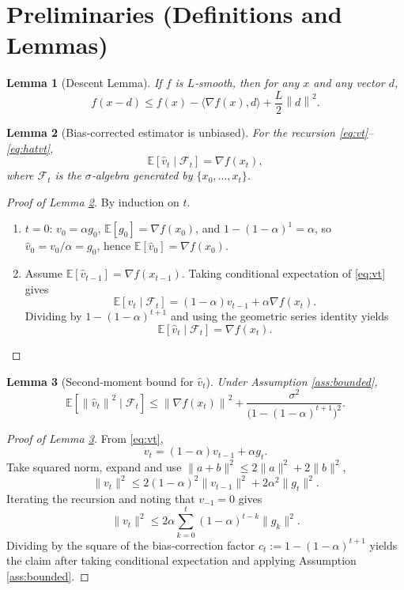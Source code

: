 \documentclass{article}
\newtheorem{lemma}{Lemma}
\newcommand{\E}{\mathbb{E}}
\newcommand{\norm}[1]{\left\lVert#1\right\rVert}
\begin{document}
\newpage
\section*{Preliminaries (Definitions and Lemmas)}
\begin{lemma}[Descent Lemma]\label{lem:descent}
If $f$ is $L$‑smooth, then for any $x$ and any vector $d$,
\[
f(x-d)\le f(x)-\langle\nabla f(x),d\rangle+\frac{L}{2}\norm{d}^2 .
\]
\end{lemma}
\begin{lemma}[Bias‑corrected estimator is unbiased]\label{lem:unbiased}
For the recursion \eqref{eq:vt}–\eqref{eq:hatvt},
\[
\E[\hat v_t\mid\mathcal{F}_t]=\nabla f(x_t),
\]
where $\mathcal{F}_t$ is the $\sigma$‑algebra generated by $\{x_0,\dots,x_t\}$.
\end{lemma}
\begin{proof}[Proof of Lemma \ref{lem:unbiased}]
By induction on $t$.
\begin{enumerate}
    \item[(Base)] $t=0$: $v_0=\alpha g_0$, $\E[g_0]=\nabla f(x_0)$, and $1-(1-\alpha)^{1}=\alpha$, so $\hat v_0=v_0/\alpha=g_0$, hence $\E[\hat v_0]=\nabla f(x_0)$.
    \item[(Induction)] Assume $\E[\hat v_{t-1}]=\nabla f(x_{t-1})$. Taking conditional expectation of \eqref{eq:vt} gives
    \[
    \E[v_t\mid\mathcal{F}_t]=(1-\alpha)v_{t-1}+\alpha\nabla f(x_t).
    \]
    Dividing by $1-(1-\alpha)^{t+1}$ and using the geometric series identity yields
    \[
    \E[\hat v_t\mid\mathcal{F}_t]=\nabla f(x_t).
    \]
\end{enumerate}
\end{proof}
\begin{lemma}[Second‑moment bound for $\hat v_t$]\label{lem:var}
Under Assumption \ref{ass:bounded},
\[
\E\!\left[\norm{\hat v_t}^2\mid\mathcal{F}_t\right]\le
\norm{\nabla f(x_t)}^2+\frac{\sigma^2}{\big(1-(1-\alpha)^{t+1}\big)^2}.
\]
\end{lemma}
\begin{proof}[Proof of Lemma \ref{lem:var}]
From \eqref{eq:vt},
\[
v_t=(1-\alpha)v_{t-1}+\alpha g_t.
\]
Take squared norm, expand and use $\|a+b\|^2\le 2\|a\|^2+2\|b\|^2$,
\[
\|v_t\|^2\le 2(1-\alpha)^2\|v_{t-1}\|^2+2\alpha^2\|g_t\|^2 .
\]
Iterating the recursion and noting that $v_{-1}=0$ gives
\[
\|v_t\|^2\le 2\alpha\sum_{k=0}^{t}(1-\alpha)^{t-k}\|g_k\|^2 .
\]
Dividing by the square of the bias‑correction factor $c_t:=1-(1-\alpha)^{t+1}$ yields the claim after taking conditional expectation and applying Assumption \ref{ass:bounded}.
\end{proof}
\end{document}

